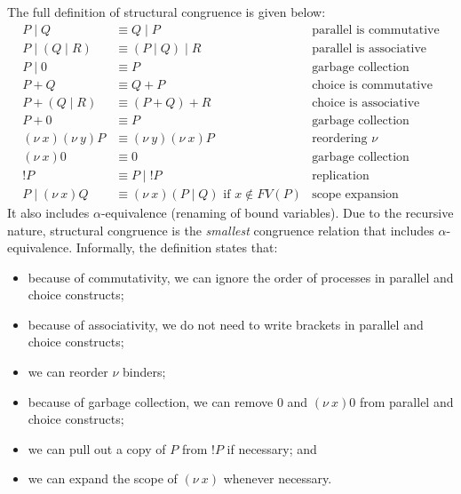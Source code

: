 \documentclass[a4paper, openany]{memoir}
\theoremstyle{definition}
\begin{document}
    The full definition of structural congruence is given below:
    \begin{align*}
        P \mid Q &\equiv Q \mid P & \textrm{parallel is commutative} \\
        P \mid (Q \mid R) &\equiv (P \mid Q) \mid R & \textrm{parallel is associative} \\
        P \mid 0 &\equiv P & \textrm{garbage collection} \\
        P + Q &\equiv Q + P & \textrm{choice is commutative} \\
        P + (Q \mid R) &\equiv (P + Q) + R & \textrm{choice is associative} \\
        P + 0 &\equiv P & \textrm{garbage collection} \\
        (\nu \ x)(\nu \ y)P &\equiv (\nu \ y)(\nu \ x)P & \textrm{reordering } \nu \\
        (\nu \ x)0 &\equiv 0 & \textrm{garbage collection} \\
        !P &\equiv P \mid !P & \textrm{replication} \\
        P \mid (\nu \ x) Q &\equiv (\nu \ x)(P \mid Q) \textrm{ if } x \not\in FV(P) & \textrm{scope expansion}
    \end{align*}
    It also includes $\alpha$-equivalence (renaming of bound variables). Due to the recursive nature, structural congruence is the \emph{smallest} congruence relation that includes $\alpha$-equivalence. Informally, the definition states that:
    \begin{itemize}
        \item because of commutativity, we can ignore the order of processes in parallel and choice constructs;
        \item because of associativity, we do not need to write brackets in parallel and choice constructs;
        \item we can reorder $\nu$ binders;
        \item because of garbage collection, we can remove $0$ and $(\nu \  x) 0$ from parallel and choice constructs;
        \item we can pull out a copy of $P$ from $!P$ if necessary; and
        \item we can expand the scope of $(\nu \ x)$ whenever necessary.
    \end{itemize}
\end{document}
